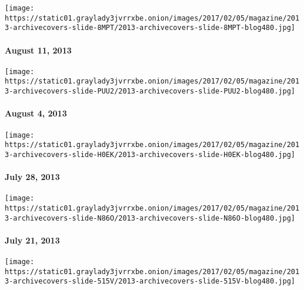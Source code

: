 \href{http://www.nytimes3xbfgragh.onion/indexes/2013/08/11/magazine/index.html}{}

\texttt{[image: https://static01.graylady3jvrrxbe.onion/images/2017/02/05/magazine/2013-archivecovers-slide-8MPT/2013-archivecovers-slide-8MPT-blog480.jpg]}

\hypertarget{august-11-2013}{%
\paragraph{August 11, 2013}\label{august-11-2013}}

\href{http://www.nytimes3xbfgragh.onion/indexes/2013/08/04/magazine/index.html}{}

\texttt{[image: https://static01.graylady3jvrrxbe.onion/images/2017/02/05/magazine/2013-archivecovers-slide-PUU2/2013-archivecovers-slide-PUU2-blog480.jpg]}

\hypertarget{august-4-2013}{%
\paragraph{August 4, 2013}\label{august-4-2013}}

\href{http://www.nytimes3xbfgragh.onion/indexes/2013/07/28/magazine/index.html}{}

\texttt{[image: https://static01.graylady3jvrrxbe.onion/images/2017/02/05/magazine/2013-archivecovers-slide-H0EK/2013-archivecovers-slide-H0EK-blog480.jpg]}

\hypertarget{july-28-2013}{%
\paragraph{July 28, 2013}\label{july-28-2013}}

\href{http://www.nytimes3xbfgragh.onion/indexes/2013/07/21/magazine/index.html}{}

\texttt{[image: https://static01.graylady3jvrrxbe.onion/images/2017/02/05/magazine/2013-archivecovers-slide-N86O/2013-archivecovers-slide-N86O-blog480.jpg]}

\hypertarget{july-21-2013}{%
\paragraph{July 21, 2013}\label{july-21-2013}}

\href{http://www.nytimes3xbfgragh.onion/indexes/2013/07/14/magazine/index.html}{}

\texttt{[image: https://static01.graylady3jvrrxbe.onion/images/2017/02/05/magazine/2013-archivecovers-slide-515V/2013-archivecovers-slide-515V-blog480.jpg]}

